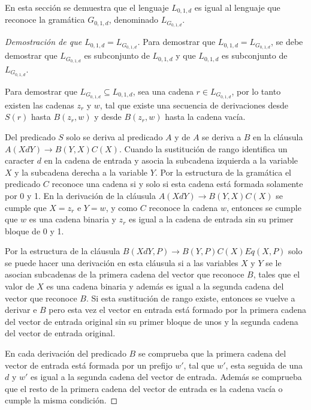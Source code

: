 En esta sección se demuestra que el lenguaje $L_{0,1,d}$ es igual al lenguaje que reconoce la gramática $G_{0,1,d}$,
denominado $L_{G_{0,1,d}}$.

\begin{proof}[Demostración de que $L_{0,1,d}=L_{G_{0,1,d}}$]
    Para demostrar que $L_{0,1,d}=L_{G_{0,1,d}}$, se debe demostrar que $L_{G_{0,1,d}}$ es subconjunto de $L_{0,1,d}$ y que
    $L_{0,1,d}$ es subconjunto de $L_{G_{0,1,d}}$. 
    
    Para demostrar que $L_{G_{0,1,d}}\subseteq L_{0,1,d}$, sea una cadena $r\in L_{G_{0,1,d}}$, por lo tanto existen las cadenas
    $z_r$ y $w$, tal que existe una secuencia de derivaciones desde $S(r)$ hasta $B(z_r,w)$ y desde $B(z_r,w)$ hasta
    la cadena vacía.
    
    Del predicado $S$ solo se deriva al predicado $A$ y de $A$ se deriva a $B$ en la cláusula $A(XdY)\to B(Y,X)C(X)$.
    Cuando la sustitución de rango identifica un caracter $d$ en la cadena de entrada y asocia la subcadena izquierda a la 
    variable $X$ y la subcadena derecha a la variable $Y$. Por la estructura de la gramática el predicado $C$ reconoce
    una cadena si y solo si esta cadena está formada solamente por 0 y 1. En la derivación de la cláusula $A(XdY)\to B(Y,X)C(X)$
    se cumple que $X=z_r$ e $Y=w$, y como $C$ reconoce la cadena $w$, entonces se cumple que $w$ es una cadena binaria
    y $z_r$ es igual a la cadena de entrada sin su primer bloque de 0 y 1.
    
    Por la estructura de la cláusula $B(XdY,P)\to B(Y,P) C(X) Eq(X,P)$ solo se puede hacer una derivación en esta cláusula
    si a las variables $X$ y $Y$ se le asocian subcadenas de la primera cadena del vector que reconoce $B$, tales que 
    el valor de $X$ es una cadena binaria y además es igual a la segunda cadena del vector que reconoce $B$. Si esta sustitución
    de rango existe, entonces se vuelve a derivar e $B$ pero esta vez el vector en entrada está formado
    por la primera cadena del vector de entrada original sin su primer bloque de unos y la segunda cadena del vector
    de entrada original. 
    
    En cada derivación del predicado $B$ se comprueba que la primera cadena del vector de entrada está formada 
    por un prefijo $w'$, tal que $w'$, esta seguida de una $d$ y $w'$ es igual a la segunda cadena del vector de entrada. Además
    se comprueba que el resto de la primera cadena del vector de entrada es la cadena vacía o cumple la misma condición.
    

\end{proof}
